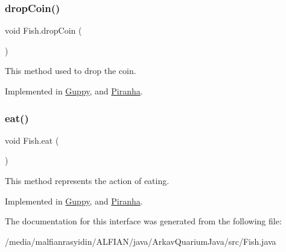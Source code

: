 \subsubsection{\texorpdfstring{drop\+Coin()}{dropCoin()}}
{\footnotesize\ttfamily void Fish.\+drop\+Coin (\begin{DoxyParamCaption}{ }\end{DoxyParamCaption})}

This method used to drop the coin. 

Implemented in \mbox{\hyperlink{class_guppy_ace5750be512718d97f184f6ede72d25f}{Guppy}}, and \mbox{\hyperlink{class_piranha_ac7d4af6cc29513e5bd351cbbaf25cc0b}{Piranha}}.

\mbox{\label{interface_fish_a72d533bdc4ac39f4ffd93d70504efed8}} 
\subsubsection{\texorpdfstring{eat()}{eat()}}
{\footnotesize\ttfamily void Fish.\+eat (\begin{DoxyParamCaption}{ }\end{DoxyParamCaption})}

This method represents the action of eating. 

Implemented in \mbox{\hyperlink{class_guppy_a8cae34f3e9f4011e41da1d098363f1fc}{Guppy}}, and \mbox{\hyperlink{class_piranha_ac9bde9a286096cf199bdb1df5434a8c8}{Piranha}}.



The documentation for this interface was generated from the following file\+:\begin{DoxyCompactItemize}
\item 
/media/malfianrasyidin/\+A\+L\+F\+I\+A\+N/java/\+Arkav\+Quarium\+Java/src/Fish.\+java\end{DoxyCompactItemize}
